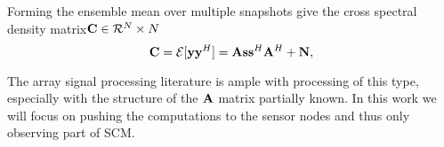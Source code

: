 
Forming the ensemble mean over multiple snapshots give the cross spectral density matrix${\bf C}\in {\cal R}^N\times N$
\begin{equation}
{\bf C}={\cal E}[{\bf y} {\bf y}^H]= {\bf A}{\bf s}{\bf s}^H{\bf A}^H+{\bf N},
\end{equation}

The array signal processing literature is ample with processing of this type, especially with the structure of the $\bf A$ matrix partially known. In this work we will focus on pushing the computations to the sensor nodes and thus only observing part of SCM.
